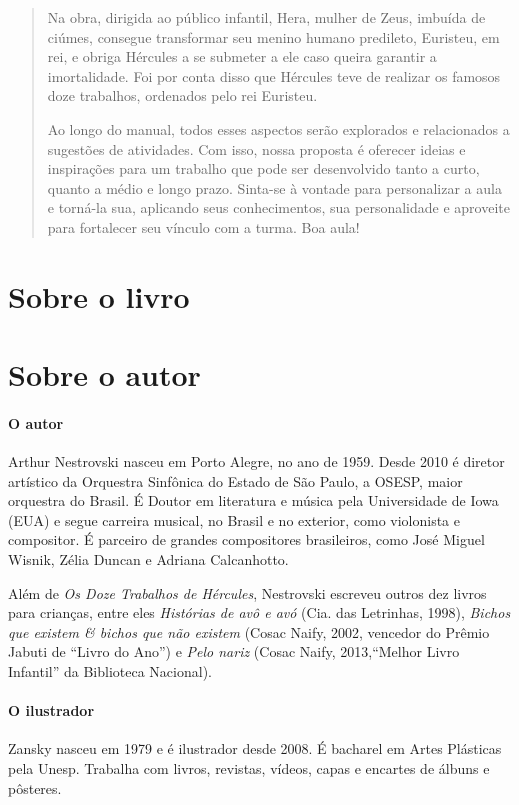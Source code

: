 \documentclass[11pt]{extarticle}
\begin{document}
\begin{abstract}
Na obra, dirigida ao público infantil, Hera, mulher de Zeus, imbuída de ciúmes, consegue transformar seu menino humano predileto, Euristeu, em rei, e obriga Hércules a se submeter a ele caso queira garantir a imortalidade. Foi por conta disso que Hércules teve de realizar os famosos doze trabalhos, ordenados pelo rei Euristeu. 

Ao longo do manual, todos esses aspectos serão explorados e relacionados a sugestões de atividades. Com isso, nossa proposta é oferecer ideias e inspirações para um trabalho que pode ser desenvolvido tanto a curto, quanto a médio e longo prazo. Sinta-se à vontade para personalizar a aula e torná-la sua, aplicando seus conhecimentos, sua personalidade e aproveite para fortalecer seu vínculo com a turma. Boa aula! 

\end{abstract}

\section{Sobre o livro}

\section{Sobre o autor}

\paragraph{O autor} Arthur Nestrovski nasceu em Porto Alegre, no ano de 1959. Desde 2010 é diretor artístico da Orquestra Sinfônica do Estado de São Paulo, a OSESP, maior orquestra do Brasil. É Doutor em literatura e música pela Universidade de Iowa (EUA) e segue carreira musical, no Brasil e no exterior, como violonista e compositor. É parceiro de grandes compositores brasileiros, como José Miguel Wisnik, Zélia Duncan e Adriana Calcanhotto. 

Além de \textit{Os Doze Trabalhos de Hércules}, Nestrovski escreveu outros dez livros para crianças, entre eles \textit{Histórias de avô e avó} (Cia. das Letrinhas, 1998), \textit{Bichos que existem \& bichos que não existem} (Cosac
Naify, 2002, vencedor do Prêmio Jabuti de ``Livro do Ano'')
e \textit{Pelo nariz} (Cosac Naify, 2013,“Melhor Livro Infantil'' da Biblioteca Nacional). 

\paragraph{O ilustrador} Zansky nasceu em 1979 e é ilustrador desde 2008. É bacharel em Artes 
Plásticas pela Unesp. Trabalha com livros, revistas, vídeos, 
capas e encartes de álbuns e pôsteres.  
\end{document}
